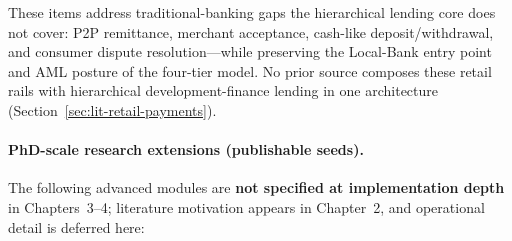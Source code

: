 \documentclass[12pt,a4paper]{report}
\begin{document}
These items address traditional-banking gaps the hierarchical lending core does not cover: P2P remittance, merchant acceptance, cash-like deposit/withdrawal, and consumer dispute resolution---while preserving the Local-Bank entry point and AML posture of the four-tier model. No prior source composes these retail rails with hierarchical development-finance lending in one architecture (Section~\ref{sec:lit-retail-payments}).

\paragraph{PhD-scale research extensions (publishable seeds).}
The following advanced modules are \textbf{not specified at implementation depth} in Chapters~3--4; literature motivation appears in Chapter~2, and operational detail is deferred here:
\end{document}
